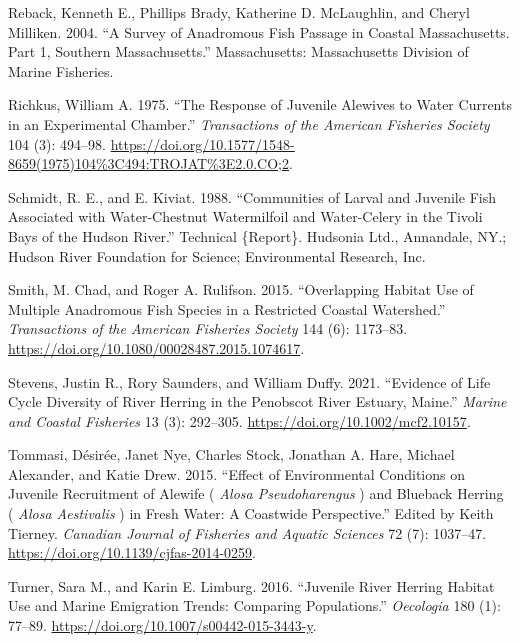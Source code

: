 \documentclass[
]{book}
\newlength{\cslhangindent}
\newlength{\cslentryspacingunit} %
\newenvironment{CSLReferences}[2] %
 {%
  \setlength{\parindent}{0pt}
  \ifodd #1
  \let\oldpar\par
  \def\par{\hangindent=\cslhangindent\oldpar}
  \fi
  \setlength{\parskip}{#2\cslentryspacingunit}
 }%
 {}
\begin{document}
\begin{CSLReferences}{1}{0}
\leavevmode{}%
Reback, Kenneth E., Phillips Brady, Katherine D. McLaughlin, and Cheryl Milliken. 2004. {``A {Survey} of {Anadromous} {Fish} {Passage} in {Coastal} {Massachusetts}. {Part} 1, {Southern} {Massachusetts}.''} Massachusetts: Massachusetts Division of Marine Fisheries.

\leavevmode{}%
Richkus, William A. 1975. {``The {Response} of {Juvenile} {Alewives} to {Water} {Currents} in an {Experimental} {Chamber}.''} \emph{Transactions of the American Fisheries Society} 104 (3): 494--98. \url{https://doi.org/10.1577/1548-8659(1975)104\%3C494:TROJAT\%3E2.0.CO;2}.

\leavevmode{}%
Schmidt, R. E., and E. Kiviat. 1988. {``Communities of {Larval} and {Juvenile} {Fish} {Associated} with {Water}-{Chestnut} {Watermilfoil} and {Water}-{Celery} in the {Tivoli} {Bays} of the {Hudson} {River}.''} Technical \{Report\}. Hudsonia Ltd., Annandale, NY.; Hudson River Foundation for Science; Environmental Research, Inc.

\leavevmode{}%
Smith, M. Chad, and Roger A. Rulifson. 2015. {``Overlapping {Habitat} {Use} of {Multiple} {Anadromous} {Fish} {Species} in a {Restricted} {Coastal} {Watershed}.''} \emph{Transactions of the American Fisheries Society} 144 (6): 1173--83. \url{https://doi.org/10.1080/00028487.2015.1074617}.

\leavevmode{}%
Stevens, Justin R., Rory Saunders, and William Duffy. 2021. {``Evidence of {Life} {Cycle} {Diversity} of {River} {Herring} in the {Penobscot} {River} {Estuary}, {Maine}.''} \emph{Marine and Coastal Fisheries} 13 (3): 292--305. \url{https://doi.org/10.1002/mcf2.10157}.

\leavevmode{}%
Tommasi, Désirée, Janet Nye, Charles Stock, Jonathan A. Hare, Michael Alexander, and Katie Drew. 2015. {``Effect of Environmental Conditions on Juvenile Recruitment of Alewife ( \emph{{Alosa} Pseudoharengus} ) and Blueback Herring ( \emph{{Alosa} Aestivalis} ) in Fresh Water: A Coastwide Perspective.''} Edited by Keith Tierney. \emph{Canadian Journal of Fisheries and Aquatic Sciences} 72 (7): 1037--47. \url{https://doi.org/10.1139/cjfas-2014-0259}.

\leavevmode{}%
Turner, Sara M., and Karin E. Limburg. 2016. {``Juvenile River Herring Habitat Use and Marine Emigration Trends: Comparing Populations.''} \emph{Oecologia} 180 (1): 77--89. \url{https://doi.org/10.1007/s00442-015-3443-y}.


\end{CSLReferences}
\end{document}
